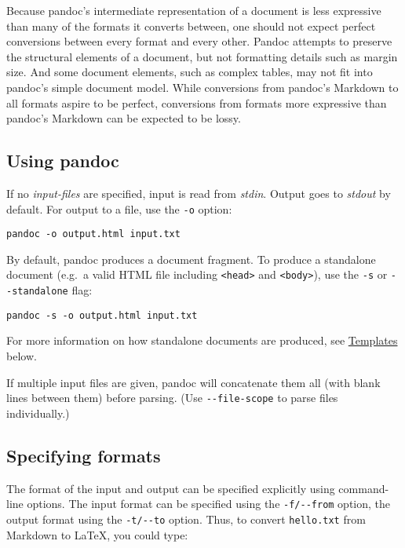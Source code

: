 \documentclass[
  a4paper,
]{article}
\begin{document}
Because pandoc's intermediate representation of a document is less
expressive than many of the formats it converts between, one should not
expect perfect conversions between every format and every other. Pandoc
attempts to preserve the structural elements of a document, but not
formatting details such as margin size. And some document elements, such
as complex tables, may not fit into pandoc's simple document model.
While conversions from pandoc's Markdown to all formats aspire to be
perfect, conversions from formats more expressive than pandoc's Markdown
can be expected to be lossy.

\hypertarget{using-pandoc}{%
\subsection{Using pandoc}\label{using-pandoc}}

If no \emph{input-files} are specified, input is read from \emph{stdin}.
Output goes to \emph{stdout} by default. For output to a file, use the
\texttt{-o} option:

\begin{verbatim}
pandoc -o output.html input.txt
\end{verbatim}

By default, pandoc produces a document fragment. To produce a standalone
document (e.g.~a valid HTML file including
\texttt{\textless{}head\textgreater{}} and
\texttt{\textless{}body\textgreater{}}), use the \texttt{-s} or
\texttt{-\/-standalone} flag:

\begin{verbatim}
pandoc -s -o output.html input.txt
\end{verbatim}

For more information on how standalone documents are produced, see
\protect\hyperlink{templates}{Templates} below.

If multiple input files are given, pandoc will concatenate them all
(with blank lines between them) before parsing. (Use
\texttt{-\/-file-scope} to parse files individually.)

\hypertarget{specifying-formats}{%
\subsection{Specifying formats}\label{specifying-formats}}

The format of the input and output can be specified explicitly using
command-line options. The input format can be specified using the
\texttt{-f/-\/-from} option, the output format using the
\texttt{-t/-\/-to} option. Thus, to convert \texttt{hello.txt} from
Markdown to LaTeX, you could type:
\end{document}
